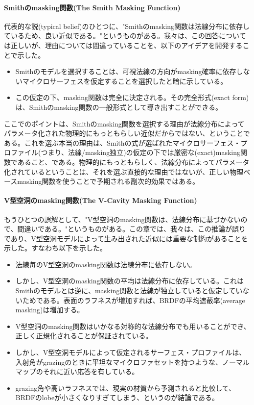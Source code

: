 \documentclass[a4j,xelatex,ja=standard]{bxjsarticle}
\begin{document}
\paragraph{Smithのmasking関数(The Smith Masking Function)}

代表的な説(typical belief)のひとつに、"Smithのmasking関数は法線分布に依存しているため、良い近似である。"というものがある。我々は、この回答については正しいが、理由については間違っていることを、以下のアイデアを開発することで示した。

\begin{itemize}
    \item Smithのモデルを選択することは、可視法線の方向がmasking確率に依存しないマイクロサーフェスを仮定することを選択したと暗に示している。
    \item この仮定の下、masking関数は完全に決定される。その完全形式(exact form)は、Smithのmasking関数の一般形式として導き出すことができる。
\end{itemize}

ここでのポイントは、Smithのmasking関数を選択する理由が法線分布によってパラメータ化された物理的にもっともらしい近似だからではない、ということである。これを選ぶ本当の理由は、Smithの式が選ばれたマイクロサーフェス・プロファイル(つまり、法線/masking独立)の仮定の下では厳密な(exact)masking関数であること、である。物理的にもっともらしく、法線分布によってパラメータ化されているということは、それを選ぶ直接的な理由ではないが、正しい物理ベースmasking関数を使うことで予期される副次的効果ではある。

\paragraph{V型空洞のmasking関数(The V-Cavity Masking Function)}

もうひとつの誤解として、"V型空洞のmasking関数は、法線分布に基づかないので、間違いである。"というものがある。この章では、我々は、この推論が誤りであり、V型空洞モデルによって生み出された近似には重要な制約があることを示した。すなわち以下を示した。

\begin{itemize}
    \item 法線毎のV型空洞のmasking関数は法線分布に依存しない。
    \item しかし、V型空洞のmasking関数の平均は法線分布に依存している。これはSmithのモデルとは逆に、masking関数と法線が独立していると仮定していないためである。表面のラフネスが増加すれば、BRDFの平均遮蔽率(average masking)は増加する。
    \item V型空洞のmasking関数はいかなる対称的な法線分布でも用いることができ、正しく正規化されることが保証されている。
    \item しかし、V型空洞モデルによって仮定されるサーフェス・プロファイルは、入射角がgrazingのときに平坦なマイクロファセットを持つような、ノーマルマップのそれに近い応答を有している。
    \item grazing角や高いラフネスでは、現実の材質から予測されると比較して、BRDFのlobeが小さくなりすぎてしまう、というのが結論である。
\end{itemize}
\end{document}

